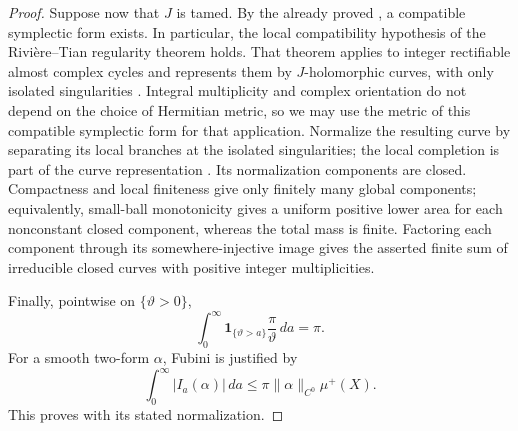 \begin{proof}
Suppose now that \(J\) is tamed.  By the already proved
, a compatible symplectic form exists.
In particular, the local compatibility hypothesis of the
Rivi\`ere--Tian regularity theorem holds.  That theorem applies to
integer rectifiable almost complex cycles and represents them by
\(J\)-holomorphic curves, with only isolated singularities
\cite[Theorem~I.1]{RiviereTian2009}.
Integral multiplicity and complex orientation do not depend on the
choice of Hermitian metric, so we may use the metric of this
compatible symplectic form for that application.
Normalize the resulting curve by separating its local branches at
the isolated singularities; the local completion is part of the
curve representation \cite[Section~VIII]{RiviereTian2009}.
Its normalization components are closed. Compactness and local
finiteness give only finitely many global components; equivalently,
small-ball monotonicity gives a uniform positive lower area for each
nonconstant closed component, whereas the total mass is finite.
Factoring each component through its somewhere-injective image gives
the asserted finite sum of irreducible closed curves with positive
integer multiplicities.

Finally, pointwise on \(\{\vartheta>0\}\),
\[
 \int_0^\infty
       \mathbf1_{\{\vartheta>a\}}\frac{\pi}{\vartheta}\,da=\pi.
\]
For a smooth two-form \(\alpha\), Fubini is justified by
\[
 \int_0^\infty |I_a(\alpha)|\,da
 \le \pi\|\alpha\|_{C^0}\mu^+(X).
\]
This proves  with its stated normalization.
\end{proof}

